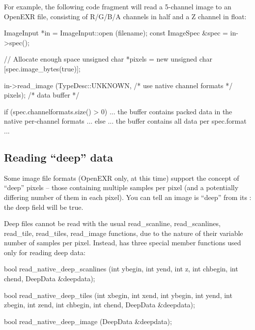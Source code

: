 For example, the following code fragment will read a 5-channel image
to an OpenEXR file, consisting of R/G/B/A channels in {\cf half} and
a Z channel in {\cf float}:

\begin{code}
        ImageInput *in = ImageInput::open (filename);
        const ImageSpec &spec = in->spec();

        // Allocate enough space
        unsigned char *pixels = new unsigned char [spec.image_bytes(true)];

        in->read_image (TypeDesc::UNKNOWN, /* use native channel formats */
                        pixels);           /* data buffer */

        if (spec.channelformats.size() > 0) {
            ... the buffer contains packed data in the native 
                per-channel formats ...
        } else {
            ... the buffer contains all data per spec.format ...
        }
\end{code}


\subsection{Reading ``deep'' data}
\label{sec:imageinput:deepdata}  
Some image file formats (OpenEXR only, at this time) support the concept
of ``deep'' pixels -- those containing multiple samples per pixel (and a
potentially differing number of them in each pixel).
You can tell an image is ``deep'' from its \ImageSpec: the {\cf deep}
field will be {\cf true}.

Deep files cannot be read with the usual {\cf read_scanline}, {\cf
  read_scanlines}, {\cf read_tile}, {\cf read_tiles}, {\cf read_image}
functions, due to the nature of their variable number of samples per
pixel.  Instead, \ImageInput has three special member functions used
only for reading deep data:

\begin{code}
    bool read_native_deep_scanlines (int ybegin, int yend, int z,
                                     int chbegin, int chend,
                                     DeepData &deepdata);

    bool read_native_deep_tiles (int xbegin, int xend, int ybegin, int yend,
                                 int zbegin, int zend,
                                 int chbegin, int chend, DeepData &deepdata);

    bool read_native_deep_image (DeepData &deepdata);
\end{code}

